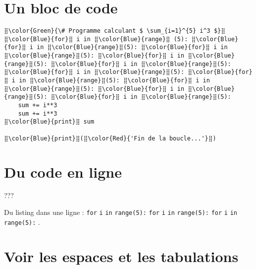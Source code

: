 \documentclass[10pt,a4paper]{article}
\begin{document}
\section{Un bloc de code}

\begin{lstlisting}[]
⣿\color{Green}{\# Programme calculant $ \sum_{i=1}^{5} i^3 $}⣿
⣿\color{Blue}{for}⣿ i in ⣿\color{Blue}{range}⣿ (5): ⣿\color{Blue}{for}⣿ i in ⣿\color{Blue}{range}⣿(5): ⣿\color{Blue}{for}⣿ i in ⣿\color{Blue}{range}⣿(5): ⣿\color{Blue}{for}⣿ i in ⣿\color{Blue}{range}⣿(5): ⣿\color{Blue}{for}⣿ i in ⣿\color{Blue}{range}⣿(5): ⣿\color{Blue}{for}⣿ i in ⣿\color{Blue}{range}⣿(5): ⣿\color{Blue}{for}⣿ i in ⣿\color{Blue}{range}⣿(5): ⣿\color{Blue}{for}⣿ i in ⣿\color{Blue}{range}⣿(5): ⣿\color{Blue}{for}⣿ i in ⣿\color{Blue}{range}⣿(5): ⣿\color{Blue}{for}⣿ i in ⣿\color{Blue}{range}⣿(5):
    sum += i**3
	sum += i**3
⣿\color{Blue}{print}⣿ sum

⣿\color{Blue}{print}⣿(⣿\color{Red}{'Fin de la boucle...'}⣿)
\end{lstlisting}


\section{Du code en ligne}

??? \lstinline{ } \lstinline{	}


Du listing dans une ligne : \texttt{\color{Blue}for} \texttt{i} \texttt{in} \texttt{\color{Blue}range}\texttt{(5):} \texttt{\color{Blue}for} \texttt{i} \texttt{in} \texttt{\color{Blue}range}\texttt{(5):} \texttt{\color{Blue}for} \texttt{i} \texttt{in} \texttt{\color{Blue}range}\texttt{(5):} .


\section{Voir les espaces et les tabulations}
\end{document}
